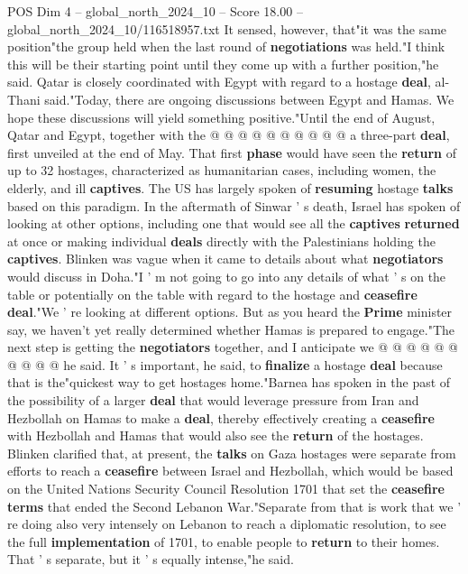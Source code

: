 \begin{textsample}{POS Dim 4 – global\_north\_2024\_10 – Score 18.00 – global\_north\_2024\_10/116518957.txt}
It sensed, however, that"it was the same position"the group held when the last round of \textbf{negotiations} was held."I think this will be their starting point until they come up with a further position,"he said.
Qatar is closely coordinated with Egypt with regard to a hostage \textbf{deal}, al-Thani said."Today, there are ongoing discussions between Egypt and Hamas.
We hope these discussions will yield something positive."Until the end of August, Qatar and Egypt, together with the @ @ @ @ @ @ @ @ @ @ a three-part \textbf{deal}, first unveiled at the end of May.
That first \textbf{phase} would have seen the \textbf{return} of up to 32 hostages, characterized as humanitarian cases, including women, the elderly, and ill \textbf{captives}.
The US has largely spoken of \textbf{resuming} hostage \textbf{talks} based on this paradigm.
In the aftermath of Sinwar ' s death, Israel has spoken of looking at other options, including one that would see all the \textbf{captives} \textbf{returned} at once or making individual \textbf{deals} directly with the Palestinians holding the \textbf{captives}.
Blinken was vague when it came to details about what \textbf{negotiators} would discuss in Doha."I ' m not going to go into any details of what ' s on the table or potentially on the table with regard to the hostage and \textbf{ceasefire} \textbf{deal}."We ' re looking at different options.
But as you heard the \textbf{Prime} minister say, we haven't yet really determined whether Hamas is prepared to engage."The next step is getting the \textbf{negotiators} together, and I anticipate we @ @ @ @ @ @ @ @ @ @ he said.
It ' s important, he said, to \textbf{finalize} a hostage \textbf{deal} because that is the"quickest way to get hostages home."Barnea has spoken in the past of the possibility of a larger \textbf{deal} that would leverage pressure from Iran and Hezbollah on Hamas to make a \textbf{deal}, thereby effectively creating a \textbf{ceasefire} with Hezbollah and Hamas that would also see the \textbf{return} of the hostages.
Blinken clarified that, at present, the \textbf{talks} on Gaza hostages were separate from efforts to reach a \textbf{ceasefire} between Israel and Hezbollah, which would be based on the United Nations Security Council Resolution 1701 that set the \textbf{ceasefire} \textbf{terms} that ended the Second Lebanon War."Separate from that is work that we ' re doing also very intensely on Lebanon to reach a diplomatic resolution, to see the full \textbf{implementation} of 1701, to enable people to \textbf{return} to their homes.
That ' s separate, but it ' s equally intense,"he said.

\end{textsample}
